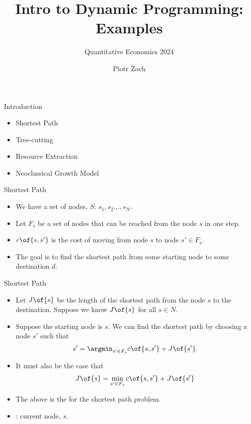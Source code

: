 \documentclass[11pt,xcolor={dvipsnames},aspectratio=159,hyperref={pdftex,pdfpagemode=UseNone,hidelinks,pdfdisplaydoctitle=true},usepdftitle=false]{beamer}
\begin{document}
\title{Intro to Dynamic Programming: Examples}
\subtitle{Quantitative Economics 2024}

\author{Piotr Żoch}%
\frame{\titlepage}

\begin{frame}{Introduction}   
    \begin{itemize}
        \item Shortest Path
        \item Tree-cutting
        \item Resource Extraction
        \item Neoclassical Growth Model  
    \end{itemize}
    \end{frame}
    
    \begin{frame}
        \end{frame}
    

\begin{frame}{Shortest Path}   
    \begin{itemize}
    \item  We have a set of nodes, $S$: $s_1, s_2 \ldots, s_{N}$.
    \item  Let $F_s$ be a set of nodes that can be reached from the node $s$ in one step. 
    \item  $c\of{s,s'}$ is the cost of moving from node $s$ to node $s'\in F_s$.
    \item  The goal is to find the shortest path from some starting node to some destination $d$.
\end{itemize}
\end{frame}

\begin{frame}{Shortest Path}   
    \begin{itemize}
    \item Let $J\of{s}$ be the length of the shortest path from the node $s$ to the destination. Suppose we know $J\of{s}$ for all $s\in N$.
    \item Suppose the starting node is $s$. We can find the shortest path by choosing a node $s'$ such that \begin{align*}
        s' = \argmin_{s'\in F_{s}} c\of{s,s'} + J\of{s'}.
    \end{align*}
    \item It must also be the case that \begin{align*}
        J\of{s} = \min_{s'\in F_{s}} c\of{s,s'} + J\of{s'}
    \end{align*}
    \item The above is the  for the shortest path problem.
    \item {}: current node, $s$.
\end{itemize}
\end{frame}
 
\end{document}
